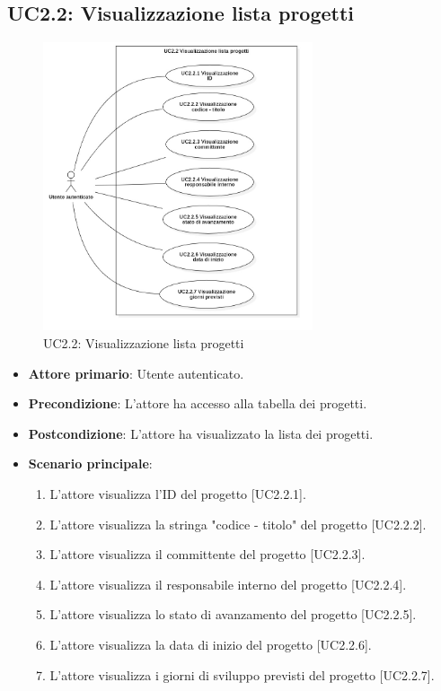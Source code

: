 \pagebreak

\subsection{UC2.2: Visualizzazione lista progetti}
\begin{figure}[!h]
\centering
\includegraphics[width=300px]{../images/UC/.jpeg/UC2.2-visualizzazioneListaProgetti.jpg}
\caption{UC2.2: Visualizzazione lista progetti}
\end{figure}

\begin{itemize}
\item \textbf{Attore primario}: Utente autenticato.
\item \textbf{Precondizione}: L'attore ha accesso alla tabella dei progetti.
\item \textbf{Postcondizione}: L'attore ha visualizzato la lista dei progetti.
\item \textbf{Scenario principale}: 
\begin{enumerate}
\item L'attore visualizza l'ID del progetto [UC2.2.1].
\item L'attore visualizza la stringa "codice - titolo" del progetto [UC2.2.2].
\item L'attore visualizza il committente del progetto [UC2.2.3].
\item L'attore visualizza il responsabile interno del progetto [UC2.2.4].
\item L'attore visualizza lo stato di avanzamento del progetto [UC2.2.5].
\item L'attore visualizza la data di inizio del progetto [UC2.2.6].
\item L'attore visualizza i giorni di sviluppo previsti del progetto [UC2.2.7].
\end{enumerate}
\end{itemize}

